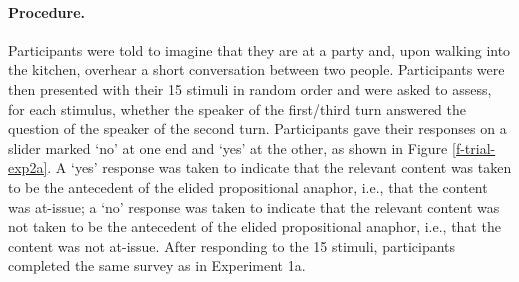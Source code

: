 \documentclass[11pt,fleqn]{article}
\newcommand{\6}{\mbox{$[\hspace*{-.6mm}[$}}
\newcommand{\9}{\mbox{$]\hspace*{-.6mm}]$}}
\begin{document}
\paragraph{Procedure.} Participants were told to imagine that they are at a party and, upon walking into the kitchen, overhear a short conversation between two people. Participants were then presented with their 15 stimuli in random order and were asked to assess, for each stimulus, whether the speaker of the first/third turn answered the question of the speaker of the second turn. Participants gave their responses on a slider marked `no' at one end and `yes' at the other, as shown in Figure \ref{f-trial-exp2a}. A `yes' response was taken to indicate that the relevant content was taken to be the antecedent of the elided propositional anaphor, i.e., that the content was at-issue; a `no' response was taken to indicate that the relevant content was not taken to be the antecedent of the elided propositional anaphor, i.e., that the content was not at-issue.
After responding to the 15 stimuli, participants completed the same survey as in Experiment 1a.
\end{document}
